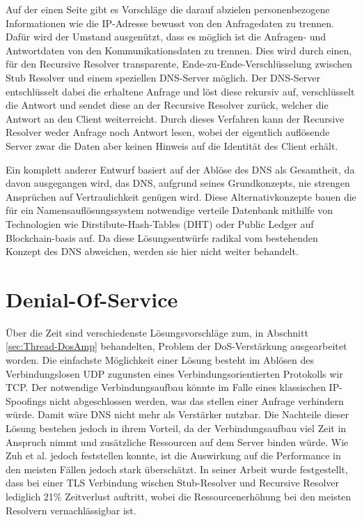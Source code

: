Auf der einen Seite gibt es Vorschläge die darauf abzielen personenbezogene Informationen wie die IP-Adresse bewusst von den Anfragedaten zu trennen. Dafür wird der Umstand ausgenützt, dass es möglich ist die Anfragen- und Antwortdaten von den Kommunikationsdaten zu trennen. Dies wird durch einen, für den Recursive Resolver transparente, Ende-zu-Ende-Verschlüsselung zwischen Stub Resolver und einem speziellen DNS-Server möglich. Der DNS-Server entschlüsselt dabei die erhaltene Anfrage und löst diese rekursiv auf, verschlüsselt die Antwort und sendet diese an der Recursive Resolver zurück, welcher die Antwort an den Client weiterreicht. Durch dieses Verfahren kann der Recursive Resolver weder Anfrage noch Antwort lesen, wobei der eigentlich auflösende Server zwar die Daten aber keinen Hinweis auf die Identität des Client erhält.

Ein komplett anderer Entwurf basiert auf der Ablöse des DNS als Gesamtheit, da davon ausgegangen wird, das DNS, aufgrund seines Grundkonzepts, nie strengen Ansprüchen auf Vertraulichkeit genügen wird. Diese Alternativkonzepte bauen die für ein Namensauflösungssystem notwendige verteile Datenbank mithilfe von Technologien wie Dirstibute-Hash-Tables (DHT) oder Public Ledger auf Blockchain-basis auf. Da diese Lösungsentwürfe radikal vom bestehenden Konzept des DNS abweichen, werden sie hier nicht weiter behandelt.      

\section{Denial-Of-Service}

Über die Zeit sind verschiedenste Lösungsvorschläge zum, in Abschnitt \ref{sec:Thread-DosAmp} behandelten, Problem der DoS-Verstärkung ausgearbeitet worden. Die einfachste Möglichkeit einer Lösung besteht im Ablösen des Verbindungslosen UDP zugunsten eines Verbindungsorientierten Protokolls wir TCP. Der notwendige Verbindungsaufbau könnte im Falle eines klassischen IP-Spoofings nicht abgeschlossen werden, was das stellen einer Anfrage verhindern würde. Damit wäre DNS nicht mehr als Verstärker nutzbar. Die Nachteile dieser Lösung bestehen jedoch in ihrem Vorteil, da der Verbindungsaufbau viel Zeit in Anspruch nimmt und zusätzliche Ressourcen auf dem Server binden würde. Wie Zuh et al. \cite{Zhu2015} jedoch feststellen konnte, ist die Auswirkung auf die Performance in den meisten Fällen jedoch stark überschätzt. In seiner Arbeit wurde festgestellt, dass bei einer TLS Verbindung wischen Stub-Resolver und Recursive Resolver lediglich 21\% Zeitverlust auftritt, wobei die Ressourcenerhöhung bei den meisten Resolvern vernachlässigbar ist. 

